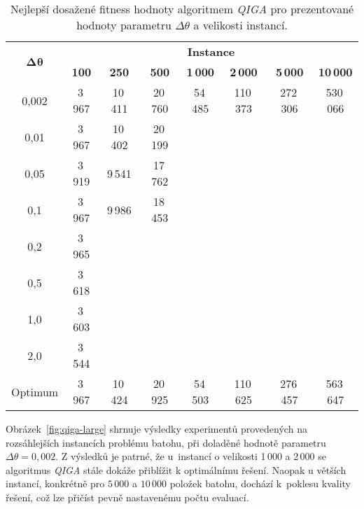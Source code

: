 \begin{table}[ht!]
    \centering
    \begin{tabular}{c c c c c c c c}
        \toprule
        \multirow{2}{*}{\centering$\boldsymbol{\Delta\theta}$\rule{0pt}{3.0ex}} & \multicolumn{7}{c}{\textbf{Instance}} \\
        \cmidrule(lr){2-8}
              & \textbf{100}    & \textbf{250}     & \textbf{500}     & \textbf{1\,000}  & \textbf{2\,000}   & \textbf{5\,000}   & \textbf{10\,000}  \\
        \midrule
        0,002 & 3\,967 & 10\,411 & 20\,760 & 54\,485 & 110\,373 & 272\,306 & 530\,066 \\
        0,01  & 3\,967 & 10\,402 & 20\,199 &         &          &          &          \\
        0,05  & 3\,919 & 9\,541  & 17\,762 &         &          &          &          \\
        0,1   & 3\,967 & 9\,986  & 18\,453 &         &          &          &          \\
        0,2   & 3\,965 &         &         &         &          &          &          \\
        0,5   & 3\,618 &         &         &         &          &          &          \\
        1,0   & 3\,603 &         &         &         &          &          &          \\
        2,0   & 3\,544 &         &         &         &          &          &          \\
        \midrule
        Optimum & 3\,967 & 10\,424 & 20\,925 & 54\,503 & 110\,625 & 276\,457 & 563\,647 \\
        \bottomrule
    \end{tabular}
    \caption{Nejlepší dosažené fitness hodnoty algoritmem \emph{QIGA} pro prezentované hodnoty parametru \(\Delta\theta\) a velikosti instancí.}
    \label{tab:qiga-theta-best}
\end{table}

Obrázek~\ref{fig:qiga-large} shrnuje výsledky experimentů provedených na rozsáhlejších instancích problému batohu, při doladěné hodnotě parametru $\Delta\theta = 0,002$. 
Z výsledků je patrné, že u~instancí o velikosti 1\,000 a 2\,000 se algoritmus \emph{QIGA} stále dokáže přiblížit k optimálnímu řešení. 
Naopak u větších instancí, konkrétně pro $5\,000$ a $10\,000$ položek batohu, dochází k~poklesu kvality řešení, což lze přičíst pevně nastavenému počtu evaluací. 

